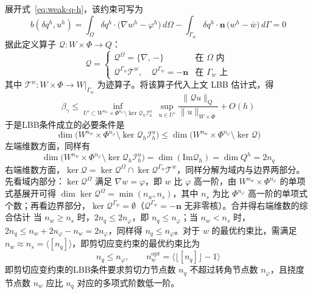 \documentclass[internationalmaster]{hquThesis}
\begin{document}
展开式~\eqref{eq:weak-q-h}，该约束可写为
\begin{equation}
    b(\delta q^{h},u^{h})
    = \int_\Omega \delta q^{h}\cdot\bigl(\nabla w^{h}-\varphi^{h}\bigr)\,d\Omega
    - \int_{\Gamma_w}\delta q^{h}\cdot\boldsymbol n\,\bigl(w^{h}-\bar{w}\bigr)\,d\Gamma = 0
    \label{eq:strain-op-decomp}
\end{equation}
据此定义算子 $\mathcal Q:W\times\Phi\to Q$：
\begin{equation}
    \mathcal Q = \begin{cases}
        \mathcal Q^\Omega = \{\nabla,\,-\} & \text{在 }\Omega\text{ 内}\\
        \mathcal Q^{\Gamma_w}\mathcal T^w,\quad \mathcal Q^{\Gamma_w}=-\boldsymbol n & \text{在 }\Gamma_w\text{ 上}
    \end{cases}
    \label{eq:op-Q}
\end{equation}
其中 $\mathcal T^w:W\times\Phi\to W|_{\Gamma_w}$ 为迹算子。将该算子代入上文 LBB 估计式，得
\begin{equation}
    \beta_\gamma \leq \inf_{U'\subset W^{n_w}\times\Phi^{n_\varphi}\setminus\ker\mathcal Q_h \mathcal I_h^{u}}\ \sup_{u\in U'}
    \frac{\| \mathcal Q u\|_Q}{\| u\|_{W\times\Phi}} + O(h)
    \label{eq:betagamma-estimate}
\end{equation}
于是LBB条件成立的必要条件是
\begin{equation}
    \dim\bigl(W^{n_w}\times\Phi^{n_\varphi}\setminus\ker\mathcal Q_h \mathcal I_h^{u}\bigr)
    \leq \dim\bigl(W^{n_w}\times\Phi^{n_\varphi}\setminus\ker\mathcal Q\bigr)
    \label{eq:nec-dim-strain}
\end{equation}
左端维数方面，同样有
\begin{equation}
    \dim\bigl(W^{n_w}\times\Phi^{n_\varphi}\setminus\ker\mathcal Q_h \mathcal I_h^{u}\bigr)
    = \dim(\mathrm{Im}\mathcal Q_h) = \dim Q^{h} = 2n_q
    \label{eq:lhs-dim-strain}
\end{equation}
右端维数方面，$\ker\mathcal Q=\ker\mathcal Q^\Omega\cap\ker\mathcal Q^{\Gamma_w}\mathcal T^w$，同样分解为域内与边界两部分。先看域内部分：$\ker\mathcal Q^\Omega$ 满足 $\nabla w=\varphi$，即 $w$ 比 $\varphi$ 高一阶，由 $W^{n_w}\times\Phi^{n_\varphi}$ 的单项式基展开可得 $\dim\ker\mathcal Q^\Omega=\min(n_w,n_s)$，其中 $n_s$ 为比 $\Phi^{n_\varphi}$ 高一阶的单项式个数；再看边界部分，$\ker\mathcal Q^{\Gamma_w}=\emptyset$（$\mathcal Q^{\Gamma_w}=-\boldsymbol n$ 无非零核）。合并得右端维数的综合估计
当 $n_w\geq n_s$ 时，$2n_q\leq 2n_\varphi$，即 $n_q\leq n_\varphi$；当 $n_w<n_s$ 时，$2n_q\leq n_w+2n_\varphi-n_w=2n_\varphi$，同样得 $n_q\leq n_\varphi$。对于 $w$ 的最优约束比，需满足 $n_w\approx n_s=\langle[n_q]\rangle$，即剪切应变约束的最优约束比为
\begin{equation}
    n_q \leq n_\varphi,\qquad n_w^{\mathrm{opt}} = \bigl\langle\lfloor [n_q]\rfloor-1\bigr\rangle
    \label{eq:ratio-strain}
\end{equation}
即剪切应变约束的LBB条件要求剪切力节点数 $n_q$ 不超过转角节点数 $n_\varphi$，且挠度节点数 $n_w$ 应比 $n_q$ 对应的多项式阶数低一阶。
\end{document}
